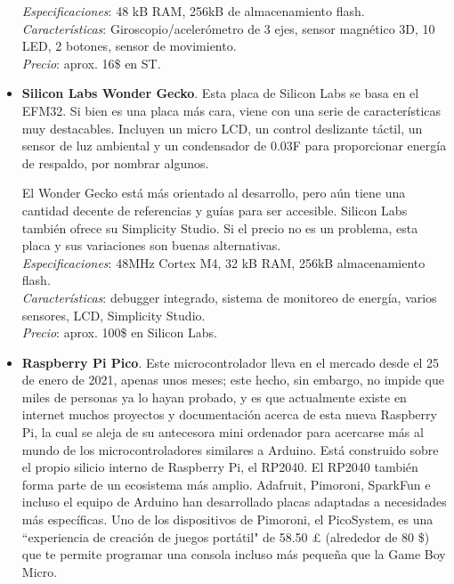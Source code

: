 \documentclass[12pt]{article}
\begin{document}
\begin{itemize}
		\textit{Especificaciones}: 48 kB RAM, 256kB de almacenamiento flash.\\
		
		\textit{Características}: Giroscopio/acelerómetro de 3 ejes, sensor magnético 3D, 10 LED, 2 botones, sensor de movimiento.\\
		
		\textit{Precio}: aprox. 16\$ en ST.
		\\
		
		\item \textbf{Silicon Labs Wonder Gecko}. Esta placa de Silicon Labs se basa en el EFM32. Si bien es una placa más cara, viene con una serie de características muy destacables. Incluyen un micro LCD, un control deslizante táctil, un sensor de luz ambiental y un condensador de 0.03F para proporcionar energía de respaldo, por nombrar algunos.
		
		El Wonder Gecko está más orientado al desarrollo, pero aún tiene una cantidad decente de referencias y guías para ser accesible. Silicon Labs también ofrece su Simplicity Studio. Si el precio no es un problema, esta placa y sus variaciones son buenas alternativas. \\
		
		\textit{Especificaciones}: 48MHz Cortex M4, 32 kB RAM, 256kB almacenamiento flash.\\
		
		\textit{Características}: debugger integrado, sistema de monitoreo de energía, varios sensores, LCD, Simplicity Studio.\\
		
		\textit{Precio}: aprox.  100\$ en Silicon Labs.\\
		
		\item \textbf{Raspberry Pi Pico}. Este microcontrolador lleva en el mercado desde el 25 de enero de 2021, apenas unos meses; este hecho, sin embargo, no impide que miles de personas ya lo hayan probado, y es que actualmente existe en internet muchos proyectos y documentación acerca de esta nueva Raspberry Pi, la cual se aleja de su antecesora mini ordenador para acercarse más al mundo de los microcontroladores similares a Arduino. Está construido sobre el propio silicio interno de Raspberry Pi, el RP2040. El RP2040 también forma parte de un ecosistema más amplio. Adafruit, Pimoroni, SparkFun e incluso el equipo de Arduino han desarrollado placas adaptadas a necesidades más específicas. Uno de los dispositivos de Pimoroni, el PicoSystem, es una ``experiencia de creación de juegos portátil" de 58.50 £ (alrededor de 80 \$) que te permite programar una consola incluso más pequeña que la Game Boy Micro.\\
		

\end{itemize}
\end{document}

